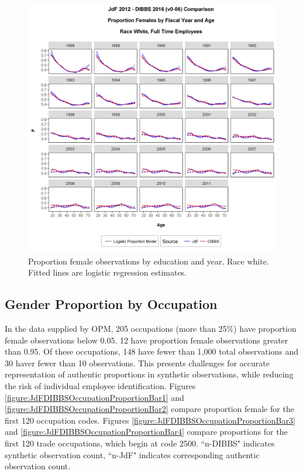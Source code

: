 \documentclass[10pt, letterpaper]{article}
\begin{document}
\begin{spacing}{1.0}
\begin{figure}[]
\centering
\includegraphics[width=6.5in, trim={0 0 0 1in}, clip]{GenderProportionLogisticModelFYRaceAgeEv0-06.png}
\caption{Proportion female observations by education and year.  Race white.  Fitted lines are logistic regression estimates.}
\label{figure:GenderProportionLogisticModelFYRaceAgeE}
\end{figure}

\clearpage

\subsection{Gender Proportion by Occupation}

In the data supplied by OPM, 205 occupations (more than 25\%) have proportion female observations below 0.05.  12 have proportion female observations greater than 0.95.  Of these occupations, 148 have fewer than 1,000 total observations and 30 haver fewer than 10 observations.  This presents challenges for accurate representation of authentic proportions in synthetic observations, while reducing the risk of individual employee identification.  Figures \ref{figure:JdFDIBBSOccupationProportionBar1} and \ref{figure:JdFDIBBSOccupationProportionBar2} compare proportion female for the first 120 occupation codes.  Figures \ref{figure:JdFDIBBSOccupationProportionBar3} and \ref{figure:JdFDIBBSOccupationProportionBar4} compare proportions for the first 120 trade occupations, which begin at code 2500.  ``n-DIBBS" indicates synthetic observation count, ``n-JdF" indicates corresponding authentic observation count.\\


\end{spacing}
\end{document}
